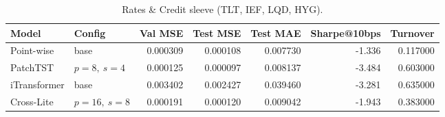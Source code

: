 \begin{table}
\caption{Rates \& Credit sleeve (TLT, IEF, LQD, HYG).}
\label{tab:rates_credit_h1}
\begin{tabular}{l l r r r r r}
\toprule
Model & Config & Val MSE & Test MSE & Test MAE & Sharpe@10bps & Turnover \\
\midrule
Point-wise & base & 0.000309 & 0.000108 & 0.007730 & -1.336 & 0.117000 \\
PatchTST & $p=8,\ s=4$ & 0.000125 & 0.000097 & 0.008137 & -3.484 & 0.603000 \\
iTransformer & base & 0.003402 & 0.002427 & 0.039460 & -3.281 & 0.635000 \\
Cross-Lite & $p=16,\ s=8$ & 0.000191 & 0.000120 & 0.009042 & -1.943 & 0.383000 \\
\bottomrule
\end{tabular}
\end{table}

